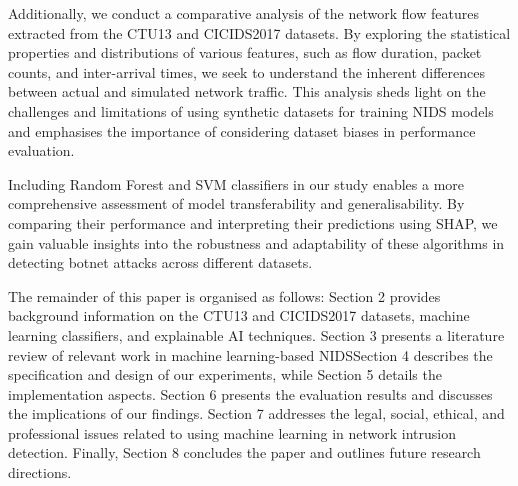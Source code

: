 Additionally, we conduct a comparative analysis of the network flow features extracted from the CTU13 and CICIDS2017 datasets. By exploring the statistical properties and distributions of various features, such as flow duration, packet counts, and inter-arrival times, we seek to understand the inherent differences between actual and simulated network traffic. This analysis sheds light on the challenges and limitations of using synthetic datasets for training NIDS models and emphasises the importance of considering dataset biases in performance evaluation.

Including Random Forest and SVM classifiers in our study enables a more comprehensive assessment of model transferability and generalisability. By comparing their performance and interpreting their predictions using SHAP, we gain valuable insights into the robustness and adaptability of these algorithms in detecting botnet attacks across different datasets.

The remainder of this paper is organised as follows: Section 2 provides background information on the CTU13 and CICIDS2017 datasets, machine learning classifiers, and explainable AI techniques. Section 3 presents a literature review of relevant work in machine learning-based NIDS\@ Section 4 describes the specification and design of our experiments, while Section 5 details the implementation aspects. Section 6 presents the evaluation results and discusses the implications of our findings. Section 7 addresses the legal, social, ethical, and professional issues related to using machine learning in network intrusion detection. Finally, Section 8 concludes the paper and outlines future research directions.